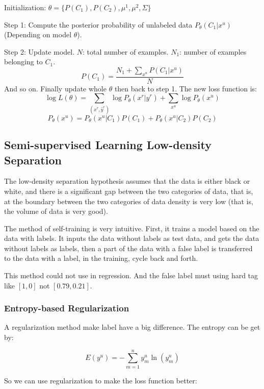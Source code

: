 \documentclass{article}
\newenvironment{propblock}[1][\textbf{Proposition}]{\begin{tcolorbox}
[title = \textbf{#1}, colback=Salmon!20, colframe=Salmon!90!Black]}{\end{tcolorbox}}
\begin{document}
\begin{propblock}[How To Do Semi-supervised Generative]
    Initialization: $\theta = \{P(C_1),P(C_2),\mu^1,\mu^2,\Sigma\}$
    
    Step 1: Compute the posterior probability of unlabeled data $P_\theta(C_1|x^u)$ (Depending on model $\theta$).

    Step 2: Update model. $N$: total number of examples. $N_1$: number of examples belonging to $C_1$.
    $$
    P(C_1) = \frac{N_1+\sum_{x^u}P(C_1|x^u)}{N}
    $$
    And so on. Finally update whole $\theta$ then back to step 1. The new loss function is:
    $$
    \log L(\theta) = \sum_{(x^r,\hat y^r)}\log P_\theta(x^r|\hat y^r) + \sum_{x^u} \log P_\theta(x^u)
    $$
    $$
    P_\theta(x^u) = P_\theta(x^u|C_1)P(C_1) + P_\theta(x^u|C_2)P(C_2)
    $$
\end{propblock}

\subsection{Semi-supervised Learning Low-density Separation}

The low-density separation hypothesis assumes that the data is either black or white, and there is a significant gap between the two categories of data, that is, at the boundary between the two categories of data density is very low (that is, the volume of data is very good).

The method of self-training is very intuitive. First, it trains a model based on the data with labels. It inputs the data without labels as test data, and gets the data without labels as labels, then a part of the data with a false label is transferred to the data with a label, in the training, cycle back and forth.

\begin{markerblock}
    This method could not use in regression. And the false label must using hard tag like $[1,0]$ not $[0.79,0.21]$.
\end{markerblock}

\subsubsection{Entropy-based Regularization}

A regularization method make label have a big difference. The entropy can be get by:

$$
E(y^u) = - \sum_{m=1}^n y^u_m \ln (y^u_m)
$$

So we can use regularization to make the loss function better:
\end{document}
